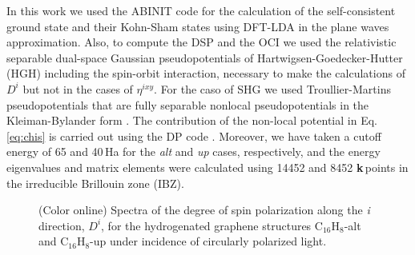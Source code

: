 \documentclass[pss]{wiley2sp} %
\begin{document}
In this work we used the ABINIT code \cite{torrent2008implementation} for the
calculation of the self-consistent ground state and their Kohn-Sham states
using DFT-LDA in the plane waves approximation. Also, to compute the DSP
and the OCI we used the relativistic separable dual-space Gaussian
pseudopotentials of Hartwigsen-Goedecker-Hutter (HGH)
\cite{hartwigsen1998relativistic} including the spin-orbit interaction,
necessary to make the calculations of $D^{i} $ but not in the cases of {$\eta^{ixy}$}.
For the caso of SHG we used Troullier-Martins pseudopotentials
\cite{troullier1991efficient} that are fully separable nonlocal
pseudopotentials in the Kleiman-Bylander form \cite{kleinman1982efficacious}.
The contribution of the non-local potential in Eq. \ref{eq:chis} is carried out
using the DP code \cite{olevanoDP}. Moreover, we have taken a cutoff energy of
65 and 40\,Ha for the \emph{alt} and \emph{up} cases, respectively, and
the energy eigenvalues and matrix elements were calculated using 14452 and 8452
\textbf{k}\,points in the irreducible Brillouin zone (IBZ).

\begin{figure}[t]
\hfill
{}
\caption{(Color online) Spectra of the degree of spin polarization along
    the \emph{i} direction, {$D^{i}$}, for the hydrogenated graphene structures
    C$_{16}$H$_{8}$-alt and C$_{16}$H$_{8}$-up under
    incidence of circularly polarized light.\label{fig:Da}}
\end{figure}
\end{document}
